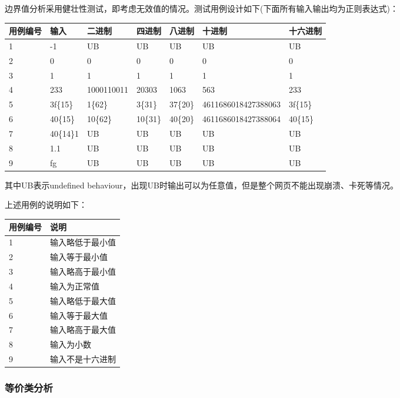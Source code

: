 \documentclass[12pt, a4paper, oneside]{ctexart}
\begin{document}
边界值分析采用健壮性测试，即考虑无效值的情况。测试用例设计如下(下面所有输入输出均为正则表达式)：
\begin{table}[!h]
    \small
    \begin{tabular}{|l|l|l|l|l|l|l|}
    \hline
    用例编号 & 输入 & 二进制 & 四进制 & 八进制 & 十进制 & 十六进制\\ \hline
    1 & -1 & UB & UB & UB & UB & UB \\ \hline
    2 & 0 & 0 & 0 & 0 & 0 & 0\\ \hline
    3 & 1 & 1 & 1 & 1 & 1 & 1 \\ \hline
    4 & 233 & 1000110011 & 20303 & 1063 & 563 & 233 \\ \hline
    5 & 3f\{15\} & 1\{62\} & 3\{31\} & 37\{20\} & 4611686018427388063 & 3f\{15\}\\ \hline
    6 & 40\{15\} & 10\{62\} & 10\{31\} & 40\{20\} & 4611686018427388064 & 40\{15\}\\ \hline
    7 & 40\{14\}1 & UB & UB & UB & UB & UB \\ \hline
    8 & 1.1 & UB & UB & UB & UB & UB\\ \hline
    9 & fg & UB & UB & UB & UB & UB\\ \hline
    \end{tabular}
\end{table}
其中UB表示undefined behaviour，出现UB时输出可以为任意值，但是整个网页不能出现崩溃、卡死等情况。

\newpage
上述用例的说明如下：
\begin{table}[!h]
    \begin{tabular}{|l|l|}
    \hline
    用例编号 & 说明\\ \hline
    1 & 输入略低于最小值\\ \hline
    2 & 输入等于最小值\\ \hline
    3 & 输入略高于最小值 \\ \hline
    4 & 输入为正常值 \\ \hline   
    5 & 输入略低于最大值\\ \hline
    6 & 输入等于最大值 \\ \hline
    7 & 输入略高于最大值 \\ \hline
    8 & 输入为小数 \\ \hline
    9 & 输入不是十六进制 \\ \hline
    \end{tabular}
\end{table}

\subsubsection{等价类分析}
\end{document}
